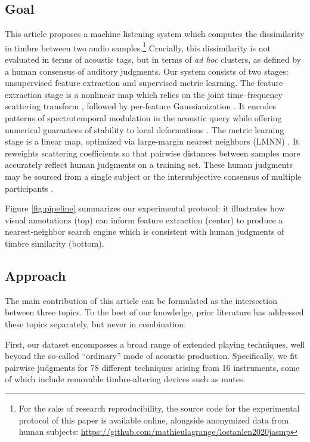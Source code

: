 \documentclass{bmcart}
\begin{document}
\subsection*{Goal}
This article proposes a machine listening system which computes the dissimilarity in timbre between two audio samples.\footnote{
For the sake of research reproducibility, the source code for the experimental protocol of this paper is available online, alongside anonymized data from human subjects:  \url{https://github.com/mathieulagrange/lostanlen2020jasmp}}
Crucially, this dissimilarity is not evaluated in terms of acoustic tags, but in terms of \emph{ad hoc} clusters, as defined by a human consensus of auditory judgments.
Our system consists of two stages: unsupervised feature extraction and supervised metric learning.
The feature extraction stage is a nonlinear map which relies on the joint time--frequency scattering transform \cite{anden2015mlsp,anden2019tsp}, followed by per-feature Gaussianization \cite{lostanlen2018jasmp}.
It encodes patterns of spectrotemporal modulation in the acoustic query while offering numerical guarantees of stability to local deformations \cite{anden2012scattering}.
The metric learning stage is a linear map, optimized via large-margin nearest neighbors (LMNN) \cite{weinberger2009distance}.
It reweights scattering coefficients so that pairwise distances between samples more accurately reflect human judgments on a training set.
These human judgments may be sourced from a single subject or the intersubjective consensus of multiple participants \cite{mcadams1995psychres}.

Figure \ref{fig:pipeline} summarizes our experimental protocol: it illustrates how visual annotations (top) can inform feature extraction (center) to produce a nearest-neighbor search engine which is consistent with human judgments of timbre similarity (bottom).


\subsection*{Approach}
The main contribution of this article can be formulated as the intersection between three topics.
To the best of our knowledge, prior literature has addressed these topics separately, but never in combination.

First, our dataset encompasses a broad range of extended playing techniques, well beyond the so-called ``ordinary'' mode of acoustic production.
Specifically, we fit pairwise judgments for 78 different techniques arising from 16 instruments, some of which include removable timbre-altering devices such as mutes.
\end{document}
